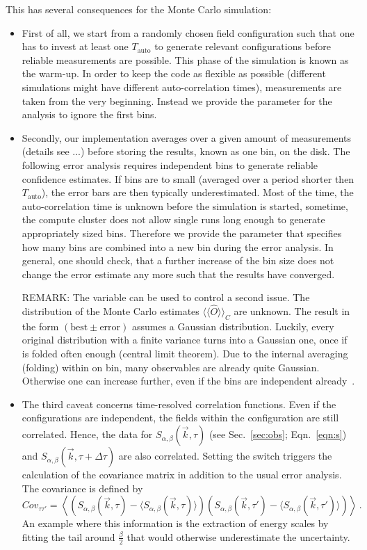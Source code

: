 This has several consequences for the Monte Carlo simulation:
\begin{itemize}
	\item First of all, we start from a randomly chosen field configuration such that one has to invest at least one $T_\mathrm{auto}$ to generate relevant configurations before reliable measurements are possible. This phase of the simulation is known as the warm-up. In order to keep the code as flexible as possible (different simulations might have different auto-correlation times), measurements are taken from the very beginning. Instead we provide the parameter  for the analysis to ignore the first  bins.
	\item Secondly, our implementation averages over a given amount of measurements (details see ...) before storing the results, known as one bin, on the disk. The following error analysis requires independent bins to generate reliable confidence estimates. If bins are to small (averaged over a period shorter then $T_\mathrm{auto}$), the error bars are then typically underestimated. Most of the time, the auto-correlation time is unknown before the simulation is started, sometime, the compute cluster does not allow single runs long enough to generate appropriately sized bins. Therefore we provide the  parameter that specifies how many bins are combined into a new bin during the error analysis. In general, one should check, that a further increase of the bin size does not change the error estimate any more such that the results have converged.
	
	REMARK: The  variable can be used to control a second issue. The distribution of the Monte Carlo estimates $\langle\langle\hat{O}\rangle\rangle_C$ are unknown. The result in the form $(\mathrm{best}\pm \mathrm{error})$ assumes a Gaussian distribution. Luckily, every original distribution with a finite variance turns into a Gaussian one, once if is folded often enough (central limit theorem). Due to the internal averaging (folding) within on bin, many observables are already quite Gaussian. Otherwise one can increase  further, even if the bins are independent already~\cite{Bercx17}.
	\item The third caveat concerns time-resolved correlation functions. Even if the configurations are independent, the fields within the configuration are still correlated. Hence, the data for $S_{\alpha,\beta}(\vec{k},\tau)$ (see Sec.~\ref{sec:obs}; Eqn.~\ref{eqn:s}) and $S_{\alpha,\beta}(\vec{k},\tau+\Delta\tau)$ are also correlated. Setting the switch  triggers the calculation of the covariance matrix in addition to the usual error analysis. The covariance is defined by
	\begin{equation}
		Cov_{\tau \tau'}=\left\langle\left(S_{\alpha,\beta}(\vec{k},\tau)-\langle S_{\alpha,\beta}(\vec{k},\tau)\rangle\right)\left(S_{\alpha,\beta}(\vec{k},\tau')-\langle S_{\alpha,\beta}(\vec{k},\tau')\rangle\right)\right\rangle\,.
	\end{equation}
	An example where this information is the extraction of energy scales by fitting the tail around $\frac{\beta}{2}$ that would otherwise underestimate the uncertainty.
\end{itemize}